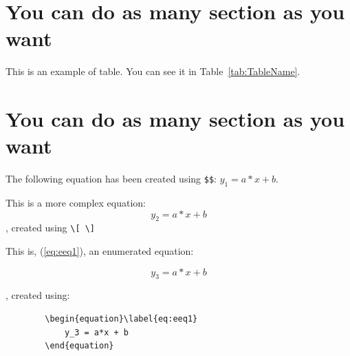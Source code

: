\documentclass[a4paper,12pt]{article}
\begin{document}
\newpage
			
\section{You can do as many section as you want}
This is an example of table. You can see it in Table~\ref{tab:TableName}. 

 \begin{table}[h!tb]
   \centering \caption{Table caption}
   \label{tab:TableName}
   \vskip 0.2cm
 \end{table}

\newpage

\section{You can do as many section as you want}
The following equation has been created using \verb.$$.: $ y_1 = a*x + b$.

\smallskip

\noindent
This is a more complex equation: \[ y_2 = a*x + b \], created using \verb.\[ \].

\bigskip

\noindent
This is, (\ref{eq:eeq1}), an enumerated equation: 

	\begin{equation}\label{eq:eeq1}
		y_3 = a*x + b
	\end{equation}

, created using:

	\begin{verbatim}
		\begin{equation}\label{eq:eeq1}
		    y_3 = a*x + b
		\end{equation}
	\end{verbatim}


\newpage



\end{document}
